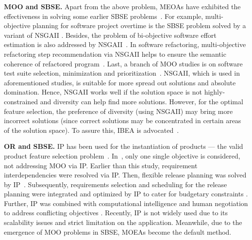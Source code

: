 \vspace{0.5mm}
\noindent\textbf{MOO and SBSE.}
Apart from the above problem, MEOAs have exhibited the effectiveness in solving some earlier SBSE problems~\cite{DBLP:journals/csur/HarmanMZ12}. For example,  multi-objective planning for software project overtime is the SBSE problem solved by a variant of NSGAII \cite{DBLP:conf/icse/FerrucciHRS13}. Besides, the problem of bi-objective software effort estimation is also addressed by NSGAII~\cite{DBLP:conf/icse/SarroPH16}.
 In software refactoring, multi-objective refactoring step recommendation via NSGAII helps to ensure the semantic coherence of refactored program~\cite{DBLP:journals/ese/MkaouerKCHD17}. Last, a branch of MOO studies is on software test suite selection, minimization and prioritization~\cite{DBLP:conf/issta/YooH07}\cite{DBLP:journals/tse/MarchettoIASS16}.
NSGAII, which is used in aforementioned studies, is suitable  for  more  spread  out solutions  and  absolute domination. Hence, NSGAII works well if the solution space is not highly-constrained and diversity can help find more solutions. However, for the optimal feature selection, the preference of diversity (using NSGAII) may bring more incorrect solutions (since correct solutions may be concentrated in certain areas of  the solution space). To assure this, IBEA is advocated~\cite{DBLP:conf/icse/SayyadMA13}\cite{conf/cmsbse/SayyadMA13}. %


\vspace{0.5mm}
\noindent\textbf{OR and SBSE.} IP has been used for the instantiation of products --- the valid product feature selection problem~\cite{DBLP:conf/splc/Broek10}. In~\cite{DBLP:conf/splc/Broek10}, only one single objective is considered, not addressing MOO via IP. Earlier than this study, requirement interdependencies were resolved via IP\cite{DBLP:journals/re/Carlshamre02}.
Then, flexible release planning was solved by IP~\cite{DBLP:conf/caise/AkkerBDV05}.
Subsequently, requirements selection and scheduling for the release planning were integrated and optimized by IP to cater for budgetary constraints  \cite{DBLP:conf/refsq/LiABD07}. Further,  IP was combined with computational intelligence and human negotiation to address conflicting objectives \cite{DBLP:journals/software/RuheS05}.
Recently, IP is not widely used due to its scalability issues and strict limitation on the application. Meanwhile, due to the emergence of MOO problems in SBSE, MOEAs  become the default method.

